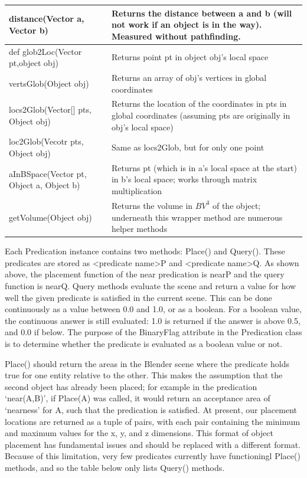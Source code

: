 \begin{longtabu}{| p{5cm} | p{10cm} |}
	distance(Vector a, Vector b) & Returns the distance between a and b (will not work if an object is in the way). Measured without pathfinding. \\\hline
	
	def glob2Loc(Vector pt,object obj) & Returns point pt in object obj's local space \\\hline
	
	vertsGlob(Object obj) & Returns an array of obj's vertices in global coordinates \\\hline
	
	locs2Glob(Vector[] pts, Object obj) & Returns the location of the coordinates in pts in global coordinates (assuming pts are originally in obj's local space) \\\hline
	
	loc2Glob(Vecotr pts, Object obj) & Same as locs2Glob, but for only one point \\\hline
	
	aInBSpace(Vector pt, Object a, Object b) & Returns pt (which is in a's local space at the start) in b's local space; works through matrix multiplication \\\hline
	
	getVolume(Object obj) & Returns the volume in $BV^3$ of the object; underneath this wrapper method are numerous helper methods \\\hline
\end{longtabu}

Each Predication instance contains two methods: Place() and Query(). These predicates are stored as <predicate name>P and <predicate name>Q. As shown above, the placement function of the near predication is nearP and the query function is nearQ. Query methods evaluate the scene and return a value for how well the given predicate is satisfied in the current scene. This can be done continuously as a value between 0.0 and 1.0, or as a boolean. For a boolean value, the continuous answer is still evaluated: 1.0 is returned if the answer is above 0.5, and 0.0 if below. The purpose of the BinaryFlag attribute in the Predication class is to determine whether the predicate is evaluated as a boolean value or not.

Place() should return the areas in the Blender scene where the predicate holds true for one entity relative to the other. This makes the assumption that the second object has already been placed; for example in the predication ‘near(A,B)’, if Place(A) was called, it would return an acceptance area of ‘nearness’ for A, such that the predication is satisfied. At present, our placement locations are returned as a tuple of pairs, with each pair containing the minimum and maximum values for the x, y, and z dimensions. This format of object placement has fundamental issues and should be replaced with a different format. Because of this limitation, very few predicates currently have functioningl Place() methods, and so the table below only lists Query() methods.

